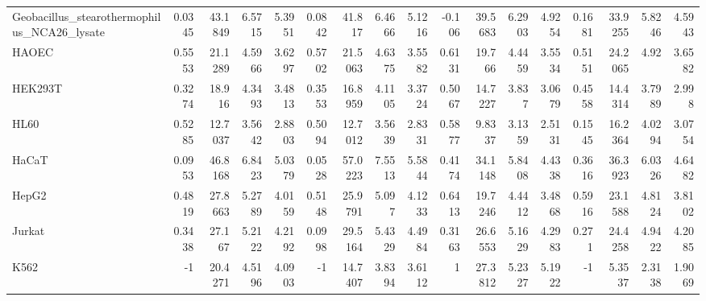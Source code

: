 \begin{tabular}{lrrrrrrrrrrrrrrrr}
 Geobacillus\_stearothermophilus\_NCA26\_lysate &               0.0345  &          43.1849 &           6.5715  &          5.3951  &         0.0842   &     41.817  &      6.4666  &     5.1216  &      -0.106    &   39.5683 &     6.2903 &   4.9254  &         0.1681   &     33.9255 &       5.8246 &     4.5943  \\
 HAOEC                                       &               0.5553  &          21.1289 &           4.5966  &          3.6297  &         0.5702   &     21.5063 &      4.6375  &     3.5582  &       0.6131   &   19.766  &     4.4459 &   3.5534  &         0.5151   &     24.2065 &       4.92   &     3.6582  \\
 HEK293T                                     &               0.3274  &          18.916  &           4.3493  &          3.4813  &         0.3553   &     16.8959 &      4.1105  &     3.3724  &       0.5067   &   14.7227 &     3.837  &   3.0679  &         0.4558   &     14.4314 &       3.7989 &     2.998   \\
 HL60                                        &               0.5285  &          12.7037 &           3.5642  &          2.8803  &         0.5094   &     12.7012 &      3.5639  &     2.8331  &       0.5877   &    9.8337 &     3.1359 &   2.5131  &         0.1545   &     16.2364 &       4.0294 &     3.0754  \\
 HaCaT                                       &               0.0953  &          46.8168 &           6.8423  &          5.0379  &         0.0528   &     57.0223 &      7.5513  &     5.5844  &       0.4174   &   34.1148 &     5.8408 &   4.4338  &         0.3616   &     36.3923 &       6.0326 &     4.6482  \\
 HepG2                                       &               0.4819  &          27.8663 &           5.2789  &          4.0159  &         0.5148   &     25.9791 &      5.097   &     4.1233  &       0.6413   &   19.7246 &     4.4412 &   3.4868  &         0.5916   &     23.1588 &       4.8124 &     3.8102  \\
 Jurkat                                      &               0.3438  &          27.167  &           5.2122  &          4.2192  &         0.0998   &     29.5164 &      5.4329  &     4.4984  &       0.3163   &   26.6553 &     5.1629 &   4.2983  &         0.271    &     24.4258 &       4.9422 &     4.2085  \\
 K562                                        &              -1       &          20.4271 &           4.5196  &          4.0903  &        -1        &     14.7407 &      3.8394  &     3.6112  &       1        &   27.3812 &     5.2327 &   5.1922  &        -1        &      5.3537 &       2.3138 &     1.9069  \\

\end{tabular}
